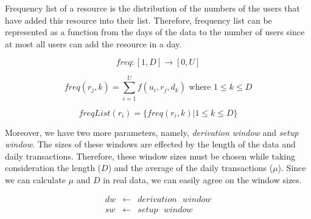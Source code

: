 \documentclass[12pt,a4paper]{report}
\begin{document}
	

	Frequency list of a resource is the distribution of the numbers of the users that have added this resource into their list. Therefore, frequency list can be represented as a function from the days of the data to the number of users since at most all users can add the resource in a day.

	$$freq : [1, D] \rightarrow [0, U]$$

	\begin{equation}
	freq(r_{j}, k) = \sum_{i=1}^U f(u_{i}, r_{j}, d_{k}) \text{ where } 1 \le k \le D \nonumber
	\end{equation}

	\begin{equation}
	freqList(r_{i}) = \{freq(r_{i}, k)| 1\le k \le D\} \nonumber
	\end{equation}

	Moreover, we have two more parameters, namely, \emph{derivation window} and \emph{setup window}. The sizes of these windows are effected by the length of the data and daily transactions. Therefore, these window sizes must be chosen while taking consideration the length ($D$) and the average of the daily transactions ($\mu$). Since we can calculate  $\mu$ and $D$ in real data, we can easily agree on the window sizes.

	\begin{eqnarray*}
	dw & \leftarrow & derivation \text{ } window \\
	sw & \leftarrow & setup \text{ } window
	\end{eqnarray*}

	\clearpage 
	
\end{document}
